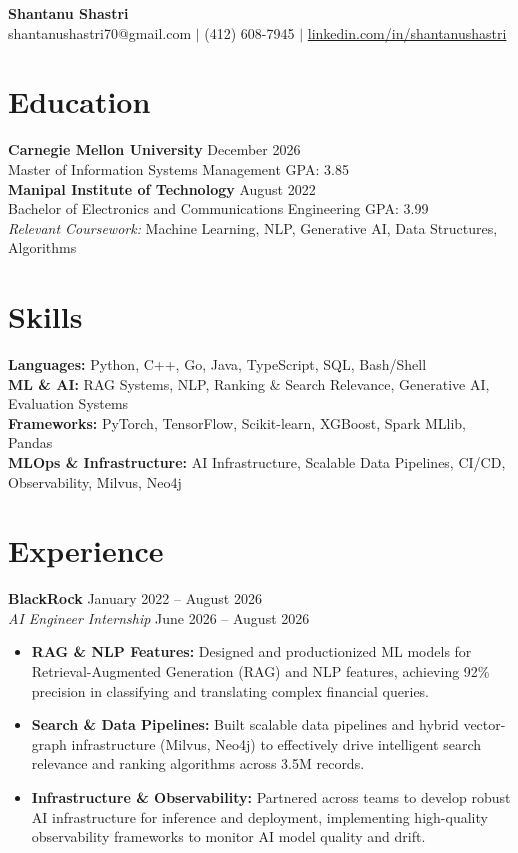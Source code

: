 \documentclass[11pt,a4paper]{article}
\begin{document}
\begin{center}
    \Huge \textbf{Shantanu Shastri} \\
    \vspace{2pt}
    \small shantanushastri70@gmail.com $|$ (412) 608-7945 $|$ \href{https://linkedin.com/in/shantanushastri}{linkedin.com/in/shantanushastri}
\end{center}

\vspace{-5pt}
\section{Education}
\noindent
\textbf{Carnegie Mellon University} \hfill December 2026 \\
Master of Information Systems Management \hfill GPA: 3.85 \\
\textbf{Manipal Institute of Technology} \hfill August 2022 \\
Bachelor of Electronics and Communications Engineering \hfill GPA: 3.99 \\
\textit{Relevant Coursework:} Machine Learning, NLP, Generative AI, Data Structures, Algorithms

\vspace{-5pt}
\section{Skills}
\noindent
\textbf{Languages:} Python, C++, Go, Java, TypeScript, SQL, Bash/Shell \\
\textbf{ML \& AI:} RAG Systems, NLP, Ranking \& Search Relevance, Generative AI, Evaluation Systems \\
\textbf{Frameworks:} PyTorch, TensorFlow, Scikit-learn, XGBoost, Spark MLlib, Pandas \\
\textbf{MLOps \& Infrastructure:} AI Infrastructure, Scalable Data Pipelines, CI/CD, Observability, Milvus, Neo4j

\vspace{-5pt}
\section{Experience}
\noindent
\textbf{BlackRock} \hfill January 2022 -- August 2026 \\
\textit{AI Engineer Internship} \hfill June 2026 -- August 2026
\begin{itemize}[leftmargin=*,noitemsep,topsep=0pt]
    \item \textbf{RAG \& NLP Features:} Designed and productionized ML models for Retrieval-Augmented Generation (RAG) and NLP features, achieving 92\% precision in classifying and translating complex financial queries.
    \item \textbf{Search \& Data Pipelines:} Built scalable data pipelines and hybrid vector-graph infrastructure (Milvus, Neo4j) to effectively drive intelligent search relevance and ranking algorithms across 3.5M records.
    \item \textbf{Infrastructure \& Observability:} Partnered across teams to develop robust AI infrastructure for inference and deployment, implementing high-quality observability frameworks to monitor AI model quality and drift.
\end{itemize}
\end{document}
